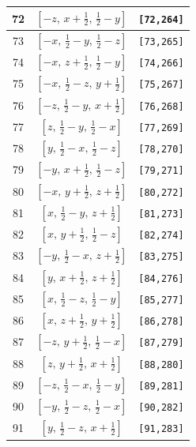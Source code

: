 \documentclass[fleqn,8pt]{jsarticle}
\begin{document}
\begin{longtable}{ccc}
72 & $\left[ - z,\, x + \frac{1}{2},\, \frac{1}{2} - y \right]$ & {\tt [72,264]} \\ \hline
73 & $\left[ - x,\, \frac{1}{2} - y,\, \frac{1}{2} - z \right]$ & {\tt [73,265]} \\ \hline
74 & $\left[ - x,\, z + \frac{1}{2},\, \frac{1}{2} - y \right]$ & {\tt [74,266]} \\ \hline
75 & $\left[ - x,\, \frac{1}{2} - z,\, y + \frac{1}{2} \right]$ & {\tt [75,267]} \\ \hline
76 & $\left[ - z,\, \frac{1}{2} - y,\, x + \frac{1}{2} \right]$ & {\tt [76,268]} \\ \hline
77 & $\left[ z,\, \frac{1}{2} - y,\, \frac{1}{2} - x \right]$ & {\tt [77,269]} \\ \hline
78 & $\left[ y,\, \frac{1}{2} - x,\, \frac{1}{2} - z \right]$ & {\tt [78,270]} \\ \hline
79 & $\left[ - y,\, x + \frac{1}{2},\, \frac{1}{2} - z \right]$ & {\tt [79,271]} \\ \hline
80 & $\left[ - x,\, y + \frac{1}{2},\, z + \frac{1}{2} \right]$ & {\tt [80,272]} \\ \hline
81 & $\left[ x,\, \frac{1}{2} - y,\, z + \frac{1}{2} \right]$ & {\tt [81,273]} \\ \hline
82 & $\left[ x,\, y + \frac{1}{2},\, \frac{1}{2} - z \right]$ & {\tt [82,274]} \\ \hline
83 & $\left[ - y,\, \frac{1}{2} - x,\, z + \frac{1}{2} \right]$ & {\tt [83,275]} \\ \hline
84 & $\left[ y,\, x + \frac{1}{2},\, z + \frac{1}{2} \right]$ & {\tt [84,276]} \\ \hline
85 & $\left[ x,\, \frac{1}{2} - z,\, \frac{1}{2} - y \right]$ & {\tt [85,277]} \\ \hline
86 & $\left[ x,\, z + \frac{1}{2},\, y + \frac{1}{2} \right]$ & {\tt [86,278]} \\ \hline
87 & $\left[ - z,\, y + \frac{1}{2},\, \frac{1}{2} - x \right]$ & {\tt [87,279]} \\ \hline
88 & $\left[ z,\, y + \frac{1}{2},\, x + \frac{1}{2} \right]$ & {\tt [88,280]} \\ \hline
89 & $\left[ - z,\, \frac{1}{2} - x,\, \frac{1}{2} - y \right]$ & {\tt [89,281]} \\ \hline
90 & $\left[ - y,\, \frac{1}{2} - z,\, \frac{1}{2} - x \right]$ & {\tt [90,282]} \\ \hline
91 & $\left[ y,\, \frac{1}{2} - z,\, x + \frac{1}{2} \right]$ & {\tt [91,283]} \\ \hline

\end{longtable}
\end{document}
